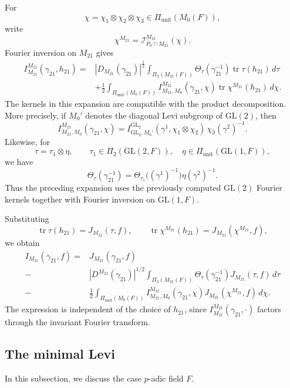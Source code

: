 \documentclass[11pt]{amsart}
\theoremstyle{definition}
\numberwithin{equation}{section}
\begin{document}
For
\[
\chi=\chi_1\otimes\chi_2\otimes\chi_3
\in\Pi_{\mathrm{unit}}(M_0(F)),
\]
write
\[
\chi^{M_{21}}
=
\mathscr I_{P_0\cap M_{21}}^{M_{21}}(\chi).
\] 
Fourier inversion on \(M_{21}\)
gives
\[
\begin{aligned}
I_{M_{21}}^{M_{21}}(\gamma_{21},h_{21})
=&
|D_{M_{21}}(\gamma_{21})|^{\frac{1}{2}}
\int_{\Pi_2(M_{21}(F))}
\Theta_\tau(\gamma_{21}^{-1})
\operatorname{tr}\tau(h_{21})\,d\tau\\
&+
\frac12
\int_{\Pi_{\mathrm{unit}}(M_0(F))}
I_{M_{21},M_0}^{M_{21}}(\gamma_{21},\chi)
\operatorname{tr}\chi^{M_{21}}(h_{21})\,d\chi.
\end{aligned}
\]
The kernels in this expansion are compatible with the product
decomposition. More precisely, if \(M_0'\) denotes the diagonal
Levi subgroup of \(\mathrm{GL}(2)\), then
\[
I_{M_{21},M_0}^{M_{21}}(\gamma_{21},\chi)
=
I_{\mathrm{GL}_2,M_0'}^{\mathrm{GL}_2}
(\gamma^1,\chi_1\otimes\chi_2)\,
\chi_3(\gamma^2)^{-1}.
\]
Likewise, for
\[
\tau=\tau_1\otimes\eta,
\qquad
\tau_1\in\Pi_2(\mathrm{GL}(2,F)),
\quad
\eta\in\Pi_{\mathrm{unit}}(\mathrm{GL}(1,F)),
\]
we have
\[
\Theta_\tau(\gamma_{21}^{-1})
=
\Theta_{\tau_1}\bigl((\gamma^1)^{-1}\bigr)
\eta(\gamma^2)^{-1}.
\]
Thus the preceding expansion uses the previously computed
\(\mathrm{GL}(2)\) Fourier kernels together with Fourier inversion
on \(\mathrm{GL}(1,F)\).

Substituting
\[
\operatorname{tr}\tau(h_{21})=J_{M_{21}}(\tau,f),
\qquad
\operatorname{tr}\chi^{M_{21}}(h_{21})
=
J_{M_{21}}(\chi^{M_{21}},f),
\]
we obtain
\begin{equation}\label{eq:maximal-levi-invariant}
\begin{aligned}
I_{M_{21}}(\gamma_{21},f)
=&
J_{M_{21}}(\gamma_{21},f)\\
-&
|D^{M_{21}}(\gamma_{21})|^{1/2}
\int_{\Pi_2(M_{21}(F))}
\Theta_\tau(\gamma_{21}^{-1})
J_{M_{21}}(\tau,f)\,d\tau\\
-&
\frac12
\int_{\Pi_{\mathrm{unit}}(M_0(F))}
I_{M_{21},M_0}^{M_{21}}(\gamma_{21},\chi)
J_{M_{21}}(\chi^{M_{21}},f)\,d\chi.
\end{aligned}
\end{equation}
The expression is independent of the choice of \(h_{21}\),
since \(I_{M_{21}}^{M_{21}}(\gamma_{21},\cdot)\) factors through
the invariant Fourier transform.






\subsection{The minimal Levi}\label{subsec:minimal-levi}
In this subsection, we discuss the case \(p\)-adic field \(F\).
\end{document}
